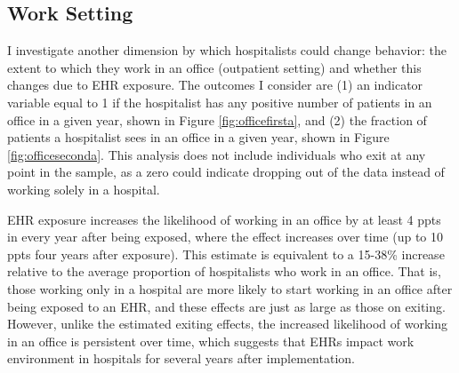 \documentclass[12pt]{article}
\begin{document}
\subsection{Work Setting}

I investigate another dimension by which hospitalists could change behavior: the extent to which they work in an office (outpatient setting) and whether this changes due to EHR exposure. The outcomes I consider are (1) an indicator variable equal to 1 if the hospitalist has any positive number of patients in an office in a given year, shown in Figure \ref{fig:officefirsta}, and (2) the fraction of patients a hospitalist sees in an office in a given year, shown in Figure \ref{fig:officeseconda}. This analysis does not include individuals who exit at any point in the sample, as a zero could indicate dropping out of the data instead of working solely in a hospital. 

EHR exposure increases the likelihood of working in an office by at least 4 ppts in every year after being exposed, where the effect increases over time (up to 10 ppts four years after exposure). This estimate is equivalent to a 15-38\% increase relative to the average proportion of hospitalists who work in an office. That is, those working only in a hospital are more likely to start working in an office after being exposed to an EHR, and these effects are just as large as those on exiting. However, unlike the estimated exiting effects, the increased likelihood of working in an office is persistent over time, which suggests that EHRs impact work environment in hospitals for several years after implementation. 
\end{document}
